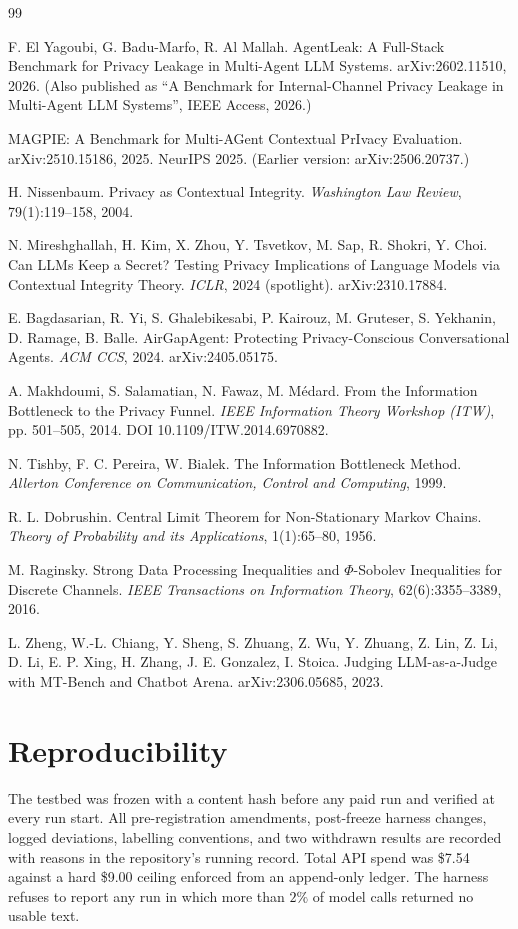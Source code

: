 \documentclass[11pt]{article}
\begin{document}
\begin{thebibliography}{99}
\small

 F. El Yagoubi, G. Badu-Marfo, R. Al Mallah. AgentLeak: A
Full-Stack Benchmark for Privacy Leakage in Multi-Agent LLM Systems.
arXiv:2602.11510, 2026. (Also published as ``A Benchmark for Internal-Channel
Privacy Leakage in Multi-Agent LLM Systems'', IEEE Access, 2026.)

 MAGPIE: A Benchmark for Multi-AGent Contextual PrIvacy
Evaluation. arXiv:2510.15186, 2025. NeurIPS 2025. (Earlier version:
arXiv:2506.20737.)

 H. Nissenbaum. Privacy as Contextual Integrity.
\emph{Washington Law Review}, 79(1):119--158, 2004.

 N. Mireshghallah, H. Kim, X. Zhou, Y. Tsvetkov, M. Sap,
R. Shokri, Y. Choi. Can LLMs Keep a Secret? Testing Privacy Implications of
Language Models via Contextual Integrity Theory. \emph{ICLR}, 2024 (spotlight).
arXiv:2310.17884.

 E. Bagdasarian, R. Yi, S. Ghalebikesabi, P. Kairouz,
M. Gruteser, S. Yekhanin, D. Ramage, B. Balle. AirGapAgent: Protecting
Privacy-Conscious Conversational Agents. \emph{ACM CCS}, 2024.
arXiv:2405.05175.

 A. Makhdoumi, S. Salamatian, N. Fawaz, M. M\'edard. From the
Information Bottleneck to the Privacy Funnel. \emph{IEEE Information Theory
Workshop (ITW)}, pp. 501--505, 2014. DOI 10.1109/ITW.2014.6970882.

 N. Tishby, F. C. Pereira, W. Bialek. The Information
Bottleneck Method. \emph{Allerton Conference on Communication, Control and
Computing}, 1999.

 R. L. Dobrushin. Central Limit Theorem for Non-Stationary
Markov Chains. \emph{Theory of Probability and its Applications},
1(1):65--80, 1956.

 M. Raginsky. Strong Data Processing Inequalities and
$\Phi$-Sobolev Inequalities for Discrete Channels. \emph{IEEE Transactions on
Information Theory}, 62(6):3355--3389, 2016.

 L. Zheng, W.-L. Chiang, Y. Sheng, S. Zhuang, Z. Wu, Y. Zhuang,
Z. Lin, Z. Li, D. Li, E. P. Xing, H. Zhang, J. E. Gonzalez, I. Stoica. Judging
LLM-as-a-Judge with MT-Bench and Chatbot Arena. arXiv:2306.05685, 2023.

\end{thebibliography}

\section*{Reproducibility}

The testbed was frozen with a content hash before any paid run and verified at
every run start. All pre-registration amendments, post-freeze harness changes,
logged deviations, labelling conventions, and two withdrawn results are recorded
with reasons in the repository's running record. Total API spend was \$7.54
against a hard \$9.00 ceiling enforced from an append-only ledger. The harness
refuses to report any run in which more than $2\%$ of model calls returned no
usable text.
\end{document}
